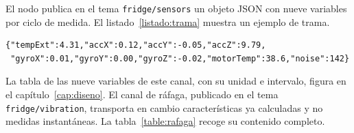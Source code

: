 El nodo publica en el tema \texttt{fridge/sensors} un objeto JSON con nueve variables por
ciclo de medida. El listado~\ref{listado:trama} muestra un ejemplo de trama.

\begin{lstlisting}[caption=Ejemplo de trama de telemetria publicada por el nodo.,label=listado:trama]
{"tempExt":4.31,"accX":0.12,"accY":-0.05,"accZ":9.79,
 "gyroX":0.01,"gyroY":0.00,"gyroZ":-0.02,"motorTemp":38.6,"noise":142}
\end{lstlisting}

La tabla de las nueve variables de este canal, con su unidad e intervalo, figura en el
capítulo~\ref{cap:diseno}. El canal de ráfaga, publicado en el tema
\texttt{fridge/vibration}, transporta en cambio características ya calculadas y no medidas
instantáneas. La tabla~\ref{table:rafaga} recoge su contenido completo.

